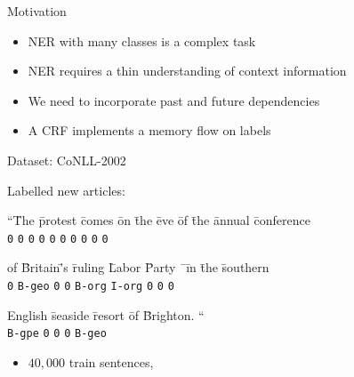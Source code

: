 \documentclass[final]{beamer}
\newlength{\onecolwid}
\begin{document}
\begin{frame}[t]
\begin{columns}[t]
\begin{column}{\onecolwid}
\begin{block}{Motivation}
    \begin{itemize}
      \item NER with many classes is a complex task
      \item NER requires a thin understanding of context information
      \item We need to incorporate past and future dependencies
      \item A CRF implements a memory flow on labels
    \end{itemize}

\end{block}

\begin{block}{Dataset: CoNLL-2002}

Labelled new articles:

\vspace{5mm}

\begin{tabbing}
``\=The \=protest \=comes \=on \=the \=eve \=of \=the \=annual \=conference \\
\>\texttt{0} \>\texttt{0} \>\texttt{0} \>\texttt{0} \>\texttt{0} \>\texttt{0} \>\texttt{0} \>\texttt{0} \>\texttt{0} \>\texttt{0}
\end{tabbing}

\vspace{5mm}

\begin{tabbing}
of \=Britain\='s \=ruling \=Labor \=Party \= \ \=in \=the \=southern \\

\texttt{0} \>\texttt{B-geo} \>\texttt{0} \>\texttt{0} \>\texttt{B-org} \>\texttt{I-org} \> \>\texttt{0} \>\texttt{0} \>\texttt{0} 
\end{tabbing}

\vspace{5mm}

\begin{tabbing}
English \=seaside \=resort \=of \=Brighton. `` \\

\texttt{B-gpe} \>\texttt{0} \>\texttt{0} \>\texttt{0} \>\texttt{B-geo}
\end{tabbing}

\vspace{10mm}


\begin{itemize}
  \item $40,000$ train sentences,


\end{itemize}
\end{block}
\end{column}
\end{columns}
\end{frame}
\end{document}
